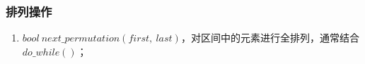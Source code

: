 \subsubsection{排列操作}
\begin{enumerate}
    \item $bool\ next\_permutation(first,\ last)$，对区间中的元素进行全排列，通常结合$do\_while()$；
\end{enumerate}